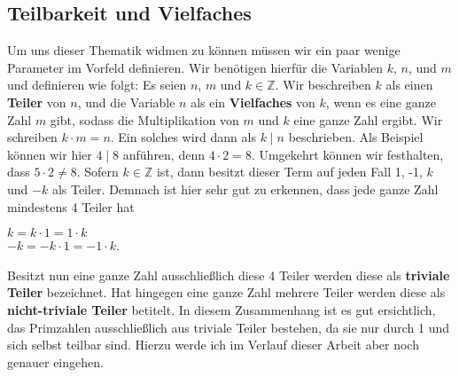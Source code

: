 \documentclass[12pt,a4paper]{article}
\theoremstyle{definition}
\begin{document}
\subsection{Teilbarkeit und Vielfaches}\label{Teilbarkeit und Vielfaches}
Um uns dieser Thematik widmen zu können müssen wir ein paar wenige Parameter im Vorfeld definieren.\newline
Wir benötigen hierfür die Variablen $k$, $n$, und $m$ und definieren wie folgt:\newline
Es seien $n$, $m$ und $k \in \mathbb{Z}$.
Wir beschreiben $k$ als einen \textbf{Teiler} von $n$, und die Variable $n$ als ein \textbf{Vielfaches} von $k$, wenn es eine ganze Zahl $m$ gibt, sodass die Multiplikation von $m$ und $k$ eine ganze Zahl ergibt.
Wir schreiben $k\cdot{m} = n$. Ein solches wird dann als $k \mid n$ beschrieben.\newline
Als Beispiel können wir hier $4 \mid 8$ anführen, denn $4 \cdot 2 = 8$.
Umgekehrt können wir festhalten, dass $5 \cdot 2 \neq 8$. \newline
Sofern $k \in \mathbb{Z}$ ist, dann besitzt dieser Term auf jeden Fall 1, -1, $k$ und $-k$ als Teiler.
Demnach ist hier sehr gut zu erkennen, dass jede ganze Zahl mindestens 4 Teiler hat
\begin{center}
$k = k \cdot 1 = 1 \cdot k$\\
$-k = -k \cdot 1 = -1 \cdot k$.
\end{center}
Besitzt nun eine ganze Zahl ausschließlich diese 4 Teiler werden diese als \textbf{triviale Teiler} bezeichnet.
Hat hingegen eine ganze Zahl mehrere Teiler werden diese als \textbf{nicht-triviale Teiler} betitelt.
In diesem Zusammenhang ist es gut ersichtlich, das Primzahlen ausschließlich aus triviale Teiler bestehen, da sie nur durch 1 und sich selbst teilbar sind.
Hierzu werde ich im Verlauf dieser Arbeit aber noch genauer eingehen.
\end{document}
